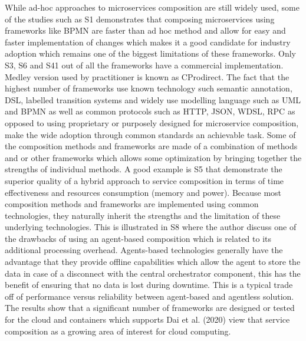 \documentclass{article}
\begin{document}
\begin{multicols}{2}
While ad-hoc approaches to microservices composition are still widely used, some of the studies such as S1 demonstrates that composing microservices using frameworks like BPMN are faster than ad hoc method and allow for easy and faster implementation of changes which makes it a good candidate for industry adoption which remains one of the biggest limitations of these frameworks. Only S3, S6 and S41 out of all the frameworks have a commercial implementation. Medley version used by practitioner is known as CProdirect. 
The fact that the highest number of frameworks use known technology such semantic annotation, DSL, labelled transition systems and widely use modelling language such as UML and BPMN as well as common protocols such as HTTP, JSON, WDSL, RPC as opposed to using proprietary or purposely designed for microservice composition, make the wide adoption through common standards an achievable task. Some of the composition methods and frameworks are made of a combination of methods and or other frameworks which allows some optimization by bringing together the strengths of individual methods. A good example is S5 that demonstrate the superior quality of a hybrid approach to service composition in terms of time effectiveness and resources consumption (memory and power).
Because most composition methods and frameworks are implemented using common technologies, they naturally inherit the strengths and the limitation of these underlying technologies. This is illustrated in S8 where the author discuss one of the drawbacks of using an agent-based composition which is related to its additional processing overhead. Agents-based technologies generally have the advantage that they provide offline capabilities which allow the agent to store the data in case of a disconnect with the central orchestrator component, this has the benefit of ensuring that no data is lost during downtime. This is a typical trade off of performance versus reliability between agent-based and agentless solution.
The results show that a significant number of frameworks are designed or tested for the cloud and containers which supports Dai et al. (2020) view that service composition as a growing area of interest for cloud computing.


\end{multicols}
\end{document}
